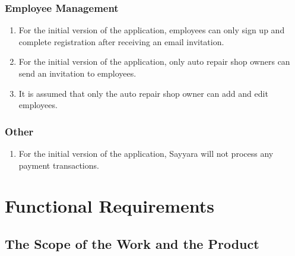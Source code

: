 \documentclass[12pt]{article}
\begin{document}
\subsubsection{Employee Management}
\begin{enumerate}
	\item For the initial version of the application, employees can only sign up and complete registration
	      after receiving an email invitation.
	\item For the initial version of the application, only auto repair shop owners can send an invitation to
	      employees.
	\item It is assumed that only the auto repair shop owner can add and edit employees.
\end{enumerate}
\subsubsection{Other}
\begin{enumerate}
	\item For the initial version of the application, Sayyara will not process any payment transactions.
\end{enumerate}

\section{Functional Requirements}

\subsection{The Scope of the Work and the Product}
\end{document}
